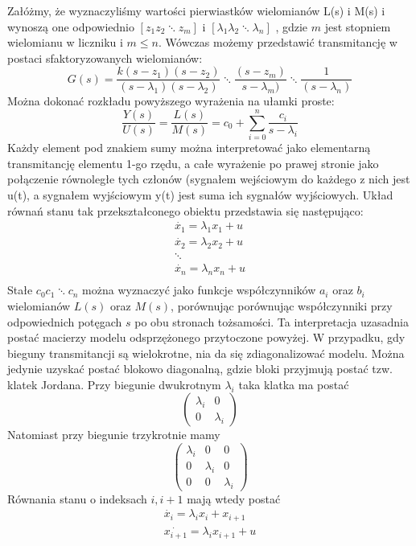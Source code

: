\documentclass{article}
\begin{document}
			Załóżmy, że wyznaczyliśmy wartości pierwiastków wielomianów L(s) i M(s) i wynoszą
			one odpowiednio  $[z_1 z_2 \ddots z_m ]$ i $[\lambda_1 \lambda_2 \ddots \lambda_n ]$
			, gdzie $m$ jest stopniem wielomianu w
			liczniku i $m \leq n$. Wówczas możemy przedstawić transmitancję w postaci
			sfaktoryzowanych wielomianów:
			\begin{equation}
				G(s) = \frac{k(s-z_1)(s-z_2)}{(s-\lambda_1)(s-\lambda_2)}\ddots\frac{(s-z_m)}{s-\lambda_m)}\ddots\frac{1}{(s-\lambda_n)}
			\end{equation}
			Można dokonać rozkładu powyższego wyrażenia na ułamki proste:
			\begin{equation}
				\frac{Y(s)}{U(s)} = \frac{L(s)}{M(s)} = c_0 + \sum^n_{i=0}\frac{c_i}{s-\lambda_i}
			\end{equation}
			Każdy element pod znakiem sumy można interpretować jako elementarną transmitancję
			elementu 1-go rzędu, a całe wyrażenie po prawej stronie jako połączenie równoległe tych
			członów (sygnałem wejściowym do każdego z nich jest u(t), a sygnałem wyjściowym y(t)
			jest suma ich sygnałów wyjściowych. Układ równań stanu tak przekształconego obiektu
			przedstawia się następująco:
			\begin{align*}
				\dot{x_1} = \lambda_1 x_1 + u \\
				\dot{x_2} = \lambda_2 x_2 + u \\
				\ddots \\
				\dot{x_n} = \lambda_n x_n + u \\
			\end{align*}
			Stałe $c_0 c_1 \ddots c_n$ można wyznaczyć jako funkcje współczynników $a_i$
			oraz $b_i$ wielomianów $L(s)$ oraz $M(s)$, porównując porównując współczynniki
			przy odpowiednich potęgach $s$ po obu stronach tożsamości.
			Ta interpretacja uzasadnia postać macierzy modelu odsprzężonego przytoczone powyżej.
			W przypadku, gdy bieguny transmitancji są wielokrotne,
			nia da się zdiagonalizować modelu. Można jedynie uzyskać postać blokowo diagonalną,
			gdzie bloki przyjmują postać tzw. klatek Jordana.
			Przy biegunie dwukrotnym $\lambda_i$ taka klatka ma postać 
			\begin{equation}
				\begin{pmatrix}
					\lambda_i & 0 \\
					0 & \lambda_i
				\end{pmatrix}
			\end{equation}
			Natomiast przy biegunie trzykrotnie mamy
			\begin{equation}
				\begin{pmatrix}
					\lambda_i & 0 & 0 \\
					0 & \lambda_i & 0 \\
					0 & 0 & \lambda_i
				\end{pmatrix}
			\end{equation}
			Równania stanu o indeksach $i, i+1$ mają wtedy postać
			\begin{align*}
				\dot{x_i} = \lambda_ix_i + x_{i+1} \\ 
				\dot{x_{i+1}} = \lambda_ix_{i+1} + u
			\end{align*}
\end{document}
